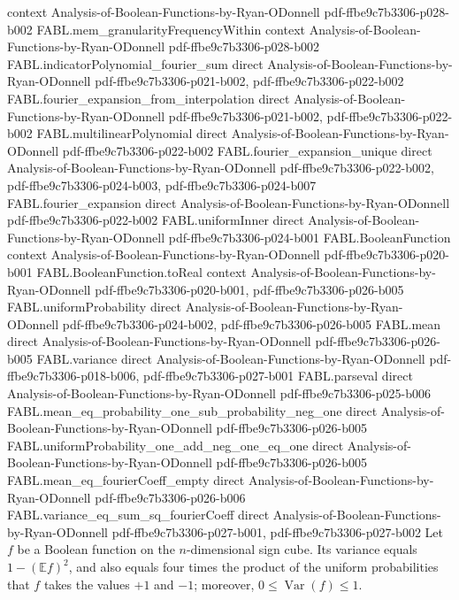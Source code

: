 \begin{theorem}
  {context}
  {Analysis-of-Boolean-Functions-by-Ryan-ODonnell}
  {pdf-ffbe9c7b3306-p028-b002}
\proofstep
  {FABL.mem_granularityFrequencyWithin}
  {context}
  {Analysis-of-Boolean-Functions-by-Ryan-ODonnell}
  {pdf-ffbe9c7b3306-p028-b002}
\proofstep
  {FABL.indicatorPolynomial_fourier_sum}
  {direct}
  {Analysis-of-Boolean-Functions-by-Ryan-ODonnell}
  {pdf-ffbe9c7b3306-p021-b002,
    pdf-ffbe9c7b3306-p022-b002}
\proofstep
  {FABL.fourier_expansion_from_interpolation}
  {direct}
  {Analysis-of-Boolean-Functions-by-Ryan-ODonnell}
  {pdf-ffbe9c7b3306-p021-b002,
    pdf-ffbe9c7b3306-p022-b002}
\proofstep
  {FABL.multilinearPolynomial}
  {direct}
  {Analysis-of-Boolean-Functions-by-Ryan-ODonnell}
  {pdf-ffbe9c7b3306-p022-b002}
\proofstep
  {FABL.fourier_expansion_unique}
  {direct}
  {Analysis-of-Boolean-Functions-by-Ryan-ODonnell}
  {pdf-ffbe9c7b3306-p022-b002,
    pdf-ffbe9c7b3306-p024-b003,
    pdf-ffbe9c7b3306-p024-b007}
\proofstep
  {FABL.fourier_expansion}
  {direct}
  {Analysis-of-Boolean-Functions-by-Ryan-ODonnell}
  {pdf-ffbe9c7b3306-p022-b002}
\proofstep
  {FABL.uniformInner}
  {direct}
  {Analysis-of-Boolean-Functions-by-Ryan-ODonnell}
  {pdf-ffbe9c7b3306-p024-b001}
\proofstep
  {FABL.BooleanFunction}
  {context}
  {Analysis-of-Boolean-Functions-by-Ryan-ODonnell}
  {pdf-ffbe9c7b3306-p020-b001}
\proofstep
  {FABL.BooleanFunction.toReal}
  {context}
  {Analysis-of-Boolean-Functions-by-Ryan-ODonnell}
  {pdf-ffbe9c7b3306-p020-b001,
    pdf-ffbe9c7b3306-p026-b005}
\proofstep
  {FABL.uniformProbability}
  {direct}
  {Analysis-of-Boolean-Functions-by-Ryan-ODonnell}
  {pdf-ffbe9c7b3306-p024-b002,
    pdf-ffbe9c7b3306-p026-b005}
\proofstep
  {FABL.mean}
  {direct}
  {Analysis-of-Boolean-Functions-by-Ryan-ODonnell}
  {pdf-ffbe9c7b3306-p026-b005}
\proofstep
  {FABL.variance}
  {direct}
  {Analysis-of-Boolean-Functions-by-Ryan-ODonnell}
  {pdf-ffbe9c7b3306-p018-b006,
    pdf-ffbe9c7b3306-p027-b001}
\proofstep
  {FABL.parseval}
  {direct}
  {Analysis-of-Boolean-Functions-by-Ryan-ODonnell}
  {pdf-ffbe9c7b3306-p025-b006}
\proofstep
  {FABL.mean_eq_probability_one_sub_probability_neg_one}
  {direct}
  {Analysis-of-Boolean-Functions-by-Ryan-ODonnell}
  {pdf-ffbe9c7b3306-p026-b005}
\proofstep
  {FABL.uniformProbability_one_add_neg_one_eq_one}
  {direct}
  {Analysis-of-Boolean-Functions-by-Ryan-ODonnell}
  {pdf-ffbe9c7b3306-p026-b005}
\proofstep
  {FABL.mean_eq_fourierCoeff_empty}
  {direct}
  {Analysis-of-Boolean-Functions-by-Ryan-ODonnell}
  {pdf-ffbe9c7b3306-p026-b006}
\proofstep
  {FABL.variance_eq_sum_sq_fourierCoeff}
  {direct}
  {Analysis-of-Boolean-Functions-by-Ryan-ODonnell}
  {pdf-ffbe9c7b3306-p027-b001,
    pdf-ffbe9c7b3306-p027-b002}
Let $f$ be a Boolean function on the $n$-dimensional sign cube. Its variance equals
$1-(\mathbb{E}f)^2$, and also equals four times the product of the uniform probabilities
that $f$ takes the values $+1$ and $-1$; moreover, $0\le \operatorname{Var}(f)\le 1$.
\end{theorem}

